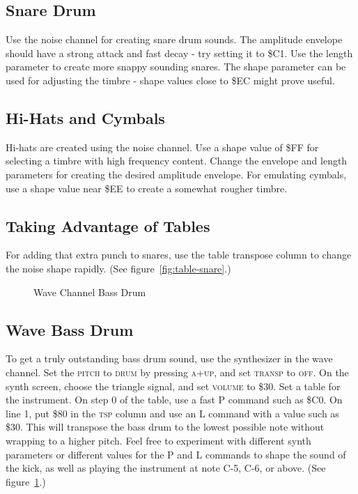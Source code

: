 \subsection{Snare Drum}

Use the noise channel for creating snare drum sounds. The amplitude envelope should have a strong attack and fast decay - try setting it to \$C1. Use the length parameter to create more snappy sounding snares. The shape parameter can be used for adjusting the timbre - shape values close to \$EC might prove useful.

\subsection{Hi-Hats and Cymbals}

Hi-hats are created using the noise channel. Use a shape value of \$FF for selecting a timbre with high frequency content. Change the envelope and length parameters for creating the desired amplitude envelope. For emulating cymbals, use a shape value near \$EE to create a somewhat rougher timbre.

\subsection{Taking Advantage of Tables}

For adding that extra punch to snares, use the table transpose column to change the noise shape rapidly. (See figure~\ref{fig:table-snare}.)

\begin{figure}[hbtp]
	\centering
	\qquad

	\qquad

	\caption{Wave Channel Bass Drum}
	\label{fig:wavekick}
\end{figure}

\subsection{Wave Bass Drum}

To get a truly outstanding bass drum sound, use the synthesizer in the wave channel. Set the \textsc{pitch} to \textsc{drum} by pressing \textsc{a+up}, and set \textsc{transp} to \textsc{off}. On the synth screen, choose the triangle signal, and set \textsc{volume} to \$30. Set a table for the instrument. On step 0 of the table, use a fast P command such as \$C0. On line 1, put \$80 in the \textsc{tsp} column and use an L command with a value such as \$30. This will transpose the bass drum to the lowest possible note without wrapping to a higher pitch.  Feel free to experiment with different synth parameters or different values for the P and L commands to shape the sound of the kick, as well as playing the instrument at note C-5, C-6, or above. (See figure~\ref{fig:wavekick}.)
